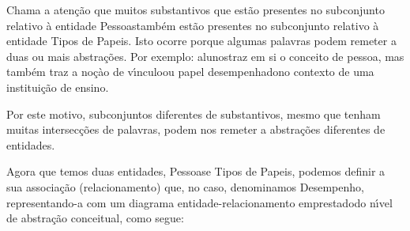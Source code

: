 \documentclass[
12pt,		%
openright,	%
twoside,  %
a4paper,			%
chapter=TITLE,		%
english,			%
french,				%
spanish,			%
brazil				%
]{USPSC-classe/USPSC}
\begin{document}
\noindent\begin{center}\mbox{\centering{}}\end{center}


Chama a aten\c{c}\~ao que muitos substantivos que est\~ao presentes no subconjunto relativo \`a entidade \textquotedbl Pessoas\textquotedbl  tamb\'em est\~ao presentes no subconjunto relativo \`a entidade \textquotedbl Tipos de Papeis\textquotedbl . Isto ocorre porque algumas palavras podem remeter a duas ou mais abstra\c{c}\~oes. Por exemplo: \textquotedbl alunos\textquotedbl  traz em si o conceito de \textquotedbl pessoa\textquotedbl , mas tamb\'em traz a no\c{c}\`ao de \textquotedbl v\'{\i}nculo\textquotedbl  ou \textquotedbl papel desempenhado\textquotedbl  no contexto de uma institui\c{c}\~ao de ensino.














Por este motivo, subconjuntos diferentes de substantivos, mesmo que tenham muitas intersec\c{c}\~oes de palavras, podem nos remeter a abstra\c{c}\~oes diferentes de entidades.














Agora que temos duas entidades, \textquotedbl Pessoas\textquotedbl  e \textquotedbl Tipos de Papeis\textquotedbl , podemos definir a sua associa\c{c}\~ao (relacionamento) que, no caso, denominamos \textquotedbl Desempenho\textquotedbl , representando-a com um diagrama entidade-relacionamento \textquotedbl emprestado\textquotedbl  do n\'{\i}vel de abstra\c{c}\~ao conceitual, como segue:
\end{document}

